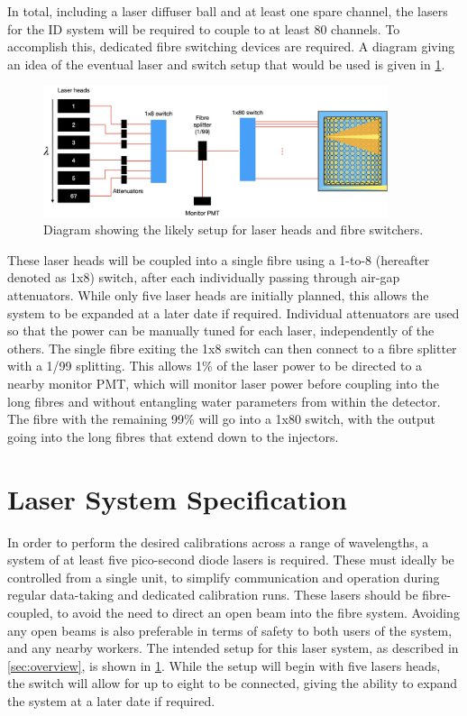 \documentclass[a4paper,11pt]{article}
\begin{document}
In total, including a laser diffuser ball and at least one spare channel, the lasers for the ID system will be required to couple to at least 80 channels. To accomplish this, dedicated fibre switching devices are required. A diagram giving an idea of the eventual laser and switch setup that would be used is given in \cref{fig:laserswitches}.
\begin{figure}[h]
\centering
\includegraphics[width=0.9\textwidth]{switchConfiguration}
\caption{Diagram showing the likely setup for laser heads and fibre switchers.}\label{fig:laserswitches}
\end{figure}
These laser heads will be coupled into a single fibre using a 1-to-8 (hereafter denoted as 1x8) switch, after each individually passing through air-gap attenuators. While only five laser heads are initially planned, this allows the system to be expanded at a later date if required. Individual attenuators are used so that the power can be manually tuned for each laser, independently of the  others. The single fibre exiting the 1x8 switch can then connect to a fibre splitter with a 1/99 splitting. This allows 1\% of the laser power to be directed to a nearby monitor PMT, which will monitor laser power before coupling into the long fibres and without entangling water parameters from within the detector. The fibre with the remaining 99\% will go into a 1x80 switch, with the output going into the long fibres that extend down to the injectors.


\section{Laser System Specification}\label{sec:laser}
In order to perform the desired calibrations across a range of wavelengths, a system of at least five pico-second diode lasers is required. These must ideally be controlled from a single unit, to simplify communication and operation during regular data-taking and dedicated calibration runs. These lasers should be fibre-coupled, to avoid the need to direct an open beam into the fibre system. Avoiding any open beams is also preferable in terms of safety to both users of the system, and any nearby workers. The intended setup for this laser system, as described in \cref{sec:overview}, is shown in \cref{fig:laserswitches}. While the setup will begin with five lasers heads, the switch will allow for up to eight to be connected, giving the ability to expand the system at a later date if required.
\end{document}

